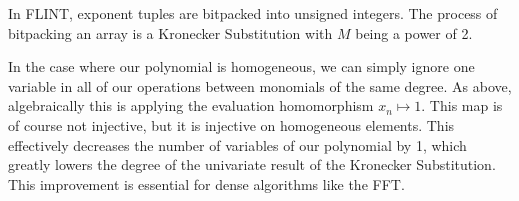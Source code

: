 \begin{rmk}
    In FLINT, exponent tuples are bitpacked into unsigned integers. The process of bitpacking an array is a Kronecker Substitution with $M$ being a power of 2.
\end{rmk}

In the case where our polynomial is homogeneous, 
we can simply ignore one variable in all of our operations between monomials of the same degree. 
As above, algebraically this is applying the evaluation
homomorphism \(x_{n} \mapsto 1\).
This map is of course not injective, but it is injective on homogeneous elements.
This effectively decreases the number of variables of our polynomial by 1, 
which greatly lowers the degree of the univariate result of the
Kronecker Substitution.
This improvement is essential for dense algorithms like the FFT.


%
%
%
%

